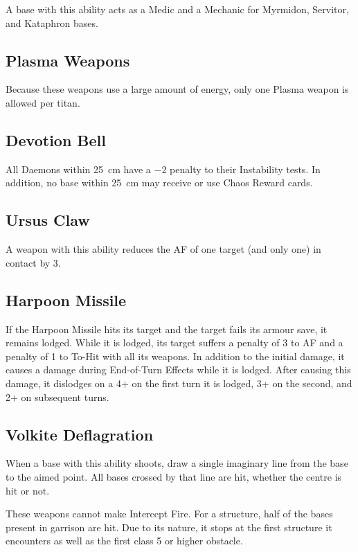 A base with this ability acts as a Medic and a Mechanic for Myrmidon, Servitor, and Kataphron bases.

\subsection{Plasma Weapons}

Because these weapons use a large amount of energy, only one Plasma weapon is allowed per titan.

\subsection{Devotion Bell}

All Daemons within 25~cm have a $-2$ penalty to their Instability tests. In addition, no base within 25~cm may receive or use Chaos Reward cards.

\subsection{Ursus Claw}

A weapon with this ability reduces the AF of one target (and only one) in contact by 3.

\subsection{Harpoon Missile}

If the Harpoon Missile hits its target and the target fails its armour save, it remains lodged. While it is lodged, its target suffers a penalty of 3 to AF and a penalty of 1 to To-Hit with all its weapons. In addition to the initial damage, it causes a damage during End-of-Turn Effects while it is lodged. After causing this damage, it dislodges on a 4+ on the first turn it is lodged, 3+ on the second, and 2+ on subsequent turns.

\subsection{Volkite Deflagration}

When a base with this ability shoots, draw a single imaginary line from the base to the aimed point. All bases crossed by that line are hit, whether the centre is hit or not.

These weapons cannot make Intercept Fire. For a structure, half of the bases present in garrison are hit. Due to its nature, it stops at the first structure it encounters as well as the first class 5 or higher obstacle.

